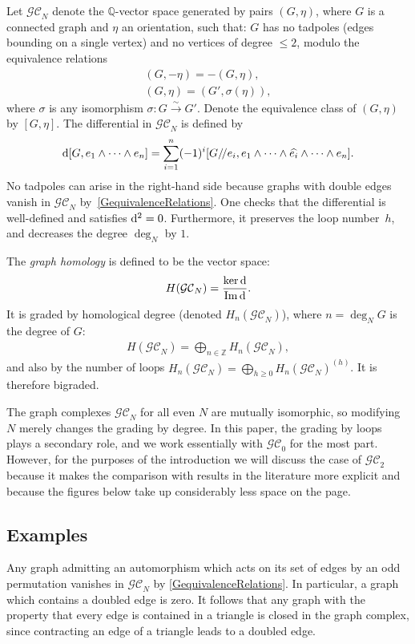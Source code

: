 \documentclass[pdftex]{sigma}%
\numberwithin{equation}{section}
\newcommand{\Z}{\mathbb Z}
\newcommand{\Q}{\mathbb Q}
\newcommand{\GC}{\mathcal{GC}}
\newcommand{\q}{/\!/}
\newcommand{\0}{\color{blue}{\mathsf{0}}}
\begin{document}
Let $\GC_N$ denote the $\Q$-vector space generated by pairs $(G,\eta)$, where $G$ is a connected graph and $\eta$ an orientation, such that: $G$ has no tadpoles (edges bounding on a single vertex) and no vertices of degree $\leq 2$, modulo the equivalence relations
\begin{gather}
(G, - \eta) = -(G, \eta), \nonumber
\\
 (G, \eta) = (G', \sigma (\eta)),\label{GequivalenceRelations}
 \end{gather}
where $\sigma$ is any isomorphism $\sigma\colon G \overset{\sim}{\rightarrow} G'$. Denote the equivalence class of $(G,\eta)$ by $[G,\eta]$. The differential in $\GC_N$ is defined by
\begin{gather*}
{\rm d} [ G, e_1 \wedge \dots \wedge e_n ] = \sum_{i=1}^n (-1)^i [G\q e_i, e_1 \wedge \dots \wedge \widehat{e_i} \wedge \dots \wedge e_n ].
\end{gather*}
No tadpoles can arise in the right-hand side because graphs with double edges vanish in $\GC_N$ by~\eqref{GequivalenceRelations}. One checks that the differential is well-defined and satisfies ${\rm d}^2=0$. Furthermore, it preserves the loop number~$h$, and decreases the degree $\deg_N$ by $1$.

\begin{defn} The \emph{graph homology} is defined to be the vector space:
\begin{gather*}
H(\GC_N) = \frac{\ker {\rm d}}{\operatorname{Im} {\rm d}}.
\end{gather*}
 It is graded by homological degree (denoted $H_n(\GC_N)$), where $n=\deg_N G$ is the degree of $G$:
 \begin{gather*}
 H(\GC_N ) = \bigoplus_{n \in \Z} H_n(\GC_N),
 \end{gather*}
and also by the number of loops $H_n(\GC_N) = \bigoplus_{h\geq0} H_n(\GC_N)^{(h)}$. It is therefore bigraded.
 \end{defn}
 The graph complexes $\GC_N$ for all even $N$ are mutually isomorphic, so modifying $N$ merely changes the grading by degree.
 In this paper, the grading by loops plays a secondary role, and we work essentially with $\GC_0$ for the most part. However, for the purposes of the introduction we will discuss the case of $\GC_2$ because it makes the comparison with results in the literature more explicit and because the figures below take up considerably less space on the page.


\subsection{Examples}
Any graph admitting an automorphism which acts on its set of edges by an odd permutation vanishes in $\GC_N$ by \eqref{GequivalenceRelations}. In particular, a graph which contains
 a doubled edge is zero. It follows that any graph with the property that every edge is contained in a triangle is closed in the graph complex, since contracting an edge of a triangle leads to a doubled edge.
\end{document}
